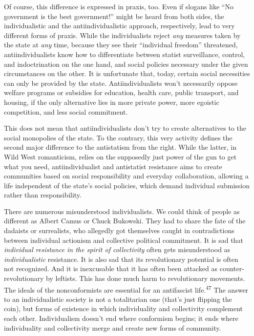 Of course, this difference is expressed in praxis, too. Even if slogans like
“No government is the best government!” might be heard from both sides, the
individualistic and the antiindividualistic approach, respectively, lead to very
different forms of praxis. While the individualists reject \textit{any} measures
taken by the state at \textit{any} time, because they see their “individual
freedom” threatened, antiindividualists know how to differentiate between
statist surveillance, control, and indoctrination on the one hand, and social
policies necessary under the given circumstances on the other. It is unfortunate
that, today, certain social necessities can only be provided by the state.
Antiindividualists won’t necessarily oppose welfare programs or subsidies for
education, health care, public transport, and housing, if the only alternative
lies in more private power, more egoistic competition, and less social
commitment.

This does not mean that antiindividualists don’t try to create alternatives to
the social monopolies of the state. To the contrary, this very activity defines
the second major difference to the antistatism from the right. While the latter,
in Wild West romanticism, relies on the supposedly just power of the gun to get
what you need, antiindividualist and antistatist resistance aims to create
communities based on social responsibility and everyday collaboration, allowing
a life independent of the state’s social policies, which demand individual
submission rather than responsibility.

There are numerous misunderstood individualists. We could think of people as
different as Albert Camus or Chuck Bukowski. They had to share the fate of the
dadaists or surrealists, who allegedly got themselves caught in contradictions
between individual actionism and collective political commitment. It is sad that
\textit{individual resistance in the spirit of collectivity} often gets
misunderstood as \textit{individualistic} resistance. It is also sad that its
revolutionary potential is often not recognized. And it is inexcusable that it
has often been attacked as counter-revolutionary by leftists. This has done much
harm to revolutionary movements. The ideals of the nonconformists are essential
for an antifascist life.\textsuperscript{47} The answer to an individualistic
society is not a totalitarian one (that’s just flipping the coin), but forms of
existence in which individuality and collectivity complement each other.
Individualism doesn’t end where conformism begins; it ends where individuality
and collectivity merge and create new forms of community.

